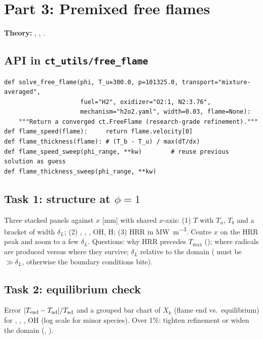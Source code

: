 \section{Part 3: Premixed free flames}

\textbf{Theory:} , , .

\subsection*{API in \texttt{ct\_utils/free\_flame}}
\begin{lstlisting}
def solve_free_flame(phi, T_u=300.0, p=101325.0, transport="mixture-averaged",
                     fuel="H2", oxidizer="O2:1, N2:3.76",
                     mechanism="h2o2.yaml", width=0.03, flame=None):
    """Return a converged ct.FreeFlame (research-grade refinement)."""
def flame_speed(flame):     return flame.velocity[0]
def flame_thickness(flame): # (T_b - T_u) / max(dT/dx)
def flame_speed_sweep(phi_range, **kw)        # reuse previous solution as guess
def flame_thickness_sweep(phi_range, **kw)
\end{lstlisting}

\subsection*{Task 1: structure at $\phi=1$}
Three stacked panels against $x$ [mm] with shared $x$-axis: (1) $T$ with $T_u$, $T_b$ and a bracket of width
$\delta_L$; (2) , , , OH, H; (3) HRR in \si{\mega\watt\per\metre\cubed}. Centre $x$ on the HRR peak
and zoom to a few $\delta_L$. Questions: why HRR precedes $T_{\max}$ (); where radicals are
produced versus where they survive; $\delta_L$ relative to the domain ( must be $\gg\delta_L$,
otherwise the boundary conditions bite).

\subsection*{Task 2: equilibrium check}
Error $|T_{\rm end}-T_{\mathrm{ad}}|/T_{\mathrm{ad}}$ and a grouped bar chart of $X_k$ (flame end vs.\ equilibrium) for ,
, , OH (log scale for minor species). Over 1\%: tighten refinement or widen the domain
(, ).

